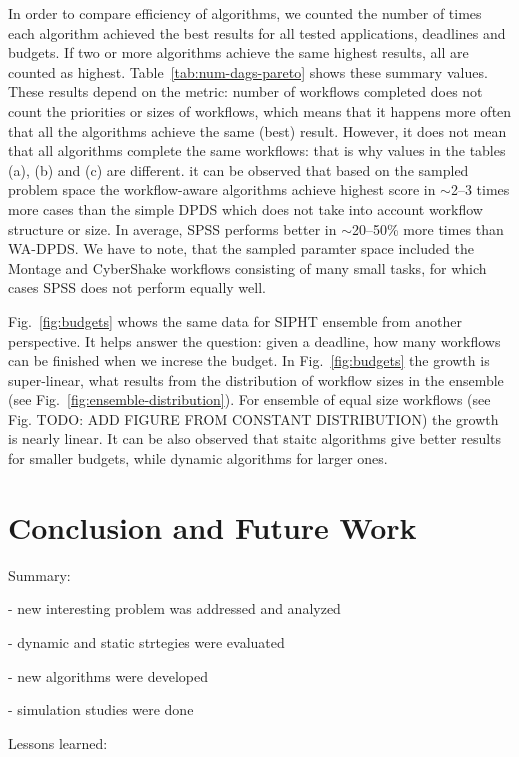 \documentclass{sig-alternate}
\begin{document}
               
In order to compare efficiency of algorithms, we counted the number of times
each algorithm achieved the best results for all tested applications, deadlines
and budgets. If two or more algorithms achieve the same highest results, all are
counted as highest. Table~\ref{tab:num-dags-pareto} shows these summary values.
These results depend on the metric: number of workflows completed does not count
the priorities or sizes of workflows, which means that it happens more often
that all the algorithms achieve the same (best) result. However, it does not
mean that all algorithms complete the same workflows: that is why values
in the tables (a), (b) and (c) are different. it can be observed that based on
the sampled problem space the workflow-aware algorithms achieve highest score
in $\sim$2--3 times more cases than the simple DPDS which does not take into
account workflow structure or size. In average, SPSS performs better in
$\sim$20--50\% more times than WA-DPDS. We have to note, that the sampled
paramter space included the Montage and CyberShake workflows consisting of many
small tasks, for which cases SPSS does not perform equally well. 
               
               
Fig.~\ref{fig:budgets} whows the same data for SIPHT ensemble from another
perspective. It helps answer the question: given a deadline, how many workflows
can be finished when we increse the budget. In Fig.~\ref{fig:budgets} the growth
is super-linear, what results from the distribution of workflow sizes in the
ensemble (see Fig.~\ref{fig:ensemble-distribution}). For ensemble of equal size
workflows (see Fig. TODO: ADD FIGURE FROM CONSTANT DISTRIBUTION) the growth is
nearly linear. It can be also observed that staitc algorithms give better
results for smaller budgets, while dynamic algorithms for larger ones.




\section{Conclusion and Future Work}

Summary:

 - new interesting problem was addressed and analyzed

 - dynamic and static strtegies were evaluated
 
 - new algorithms were developed
 
 - simulation studies were done
 
Lessons learned:
\end{document}
